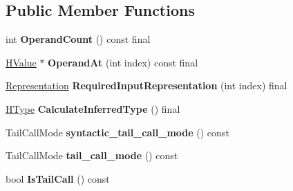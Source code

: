 \subsection*{Public Member Functions}
\begin{DoxyCompactItemize}
\item 
int {\bfseries Operand\+Count} () const  final\hypertarget{classv8_1_1internal_1_1_h_call_with_descriptor_acbf1a46a39b1b129d95c119a4ce8d016}{}\label{classv8_1_1internal_1_1_h_call_with_descriptor_acbf1a46a39b1b129d95c119a4ce8d016}

\item 
\hyperlink{classv8_1_1internal_1_1_h_value}{H\+Value} $\ast$ {\bfseries Operand\+At} (int index) const  final\hypertarget{classv8_1_1internal_1_1_h_call_with_descriptor_a2c2ef56bdbec5872afd15a43661a3591}{}\label{classv8_1_1internal_1_1_h_call_with_descriptor_a2c2ef56bdbec5872afd15a43661a3591}

\item 
\hyperlink{classv8_1_1internal_1_1_representation}{Representation} {\bfseries Required\+Input\+Representation} (int index) final\hypertarget{classv8_1_1internal_1_1_h_call_with_descriptor_aa69db5ea31e5f74cb81bcc74388e0e79}{}\label{classv8_1_1internal_1_1_h_call_with_descriptor_aa69db5ea31e5f74cb81bcc74388e0e79}

\item 
\hyperlink{classv8_1_1internal_1_1_h_type}{H\+Type} {\bfseries Calculate\+Inferred\+Type} () final\hypertarget{classv8_1_1internal_1_1_h_call_with_descriptor_a53bc84108668da34a217407cb0c8ea31}{}\label{classv8_1_1internal_1_1_h_call_with_descriptor_a53bc84108668da34a217407cb0c8ea31}

\item 
Tail\+Call\+Mode {\bfseries syntactic\+\_\+tail\+\_\+call\+\_\+mode} () const \hypertarget{classv8_1_1internal_1_1_h_call_with_descriptor_ad0c846b61f4b5f448a306044a6009209}{}\label{classv8_1_1internal_1_1_h_call_with_descriptor_ad0c846b61f4b5f448a306044a6009209}

\item 
Tail\+Call\+Mode {\bfseries tail\+\_\+call\+\_\+mode} () const \hypertarget{classv8_1_1internal_1_1_h_call_with_descriptor_af45626c51164ef70da471f8090fe917d}{}\label{classv8_1_1internal_1_1_h_call_with_descriptor_af45626c51164ef70da471f8090fe917d}

\item 
bool {\bfseries Is\+Tail\+Call} () const \hypertarget{classv8_1_1internal_1_1_h_call_with_descriptor_a22c9d9fdf04ce57f505ab80b063c6757}{}\label{classv8_1_1internal_1_1_h_call_with_descriptor_a22c9d9fdf04ce57f505ab80b063c6757}


\end{DoxyCompactItemize}
